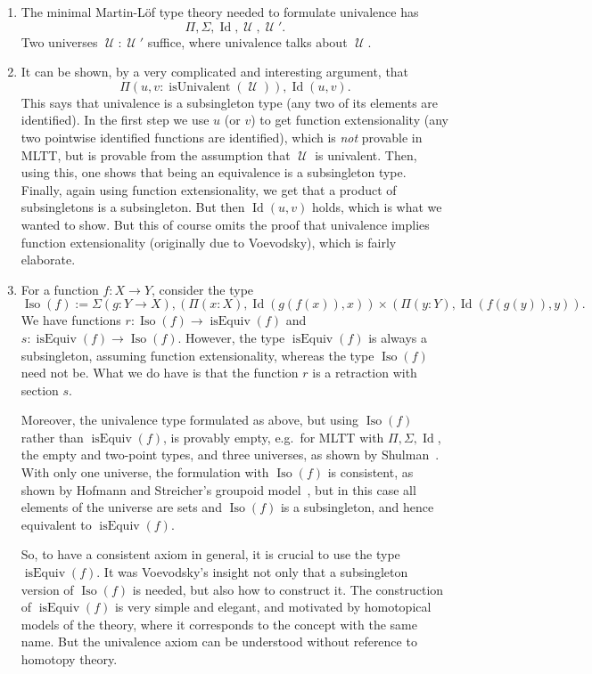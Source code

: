 \documentclass{article}
\newcommand{\Id}{\operatorname{Id}}
\newcommand{\U}{\operatorname{\mathcal{U}}}
\newcommand{\isEquiv}{\operatorname{isEquiv}}
\newcommand{\isUnivalent}{\operatorname{isUnivalent}}
\newcommand{\Iso}{\operatorname{Iso}}
\begin{document}
\begin{enumerate}
\item 
 The minimal Martin-L\"of type theory needed to formulate univalence
    has
    \[
      \Pi, \Sigma, \Id, \U, \U'.
    \]
    Two universes $\U :\U'$ suffice, where univalence talks about $\U$.
  
\item It can be shown, by a very complicated and interesting argument,
    that
    \[
     \Pi(u,v: \isUnivalent(\U)), \Id(u,v).
   \]
    This says that univalence is a subsingleton type (any two of its
    elements are identified). In the first step we use $u$ (or $v$) to get
    function extensionality (any two pointwise identified functions
    are identified), which is \emph{not} provable in MLTT, but is provable
    from the assumption that $\U$ is univalent. Then, using this, one
    shows that being an equivalence is a subsingleton type. Finally,
    again using function extensionality, we get that a product of
    subsingletons is a subsingleton. But then $\Id(u,v)$ holds, which is
    what we wanted to show. But this of course omits the proof that
    univalence implies function extensionality (originally due to
    Voevodsky), which is fairly elaborate.

 \item For a function $f:X\to Y$, consider the type
   \[
     \Iso(f) := \Sigma(g:Y\to X), (\Pi(x:X), \Id(g(f(x)),x)) \times  (\Pi(y:Y), \Id(f(g(y)),y)).
   \]
    We have functions $r:\Iso(f)\to \isEquiv(f)$ and
    $s:\isEquiv(f)\to \Iso(f)$. However, the type $\isEquiv(f)$ is always a
    subsingleton, assuming function extensionality, whereas the type
    $\Iso(f)$ need not be. What we do have is that the function $r$ is a
    retraction with section $s$.

    Moreover, the univalence type formulated as above, but using
    $\Iso(f)$ rather than $\isEquiv(f)$, is provably empty, e.g.\ for
    MLTT with $\Pi, \Sigma, \Id$, the empty and two-point types, and
    three universes, as shown by Shulman~\cite{shulman:e46}. With only
    one universe, the formulation with $\Iso(f)$ is consistent, as
    shown by Hofmann and Streicher's groupoid model~\cite{MR1686862},
    but in this case all elements of the universe are sets and
    $\Iso(f)$ is a subsingleton, and hence equivalent to
    $\isEquiv(f)$.
    
    So, to have a consistent axiom in general, it is crucial to use
    the type $\isEquiv(f)$. It was Voevodsky's insight not only that a
    subsingleton version of $\Iso(f)$ is needed, but also how to
    construct it. The construction of $\isEquiv(f)$ is very simple and
    elegant, and motivated by homotopical models of the theory, where
    it corresponds to the concept with the same name. But the
    univalence axiom can be understood without reference to homotopy
    theory.


\end{enumerate}
\end{document}
